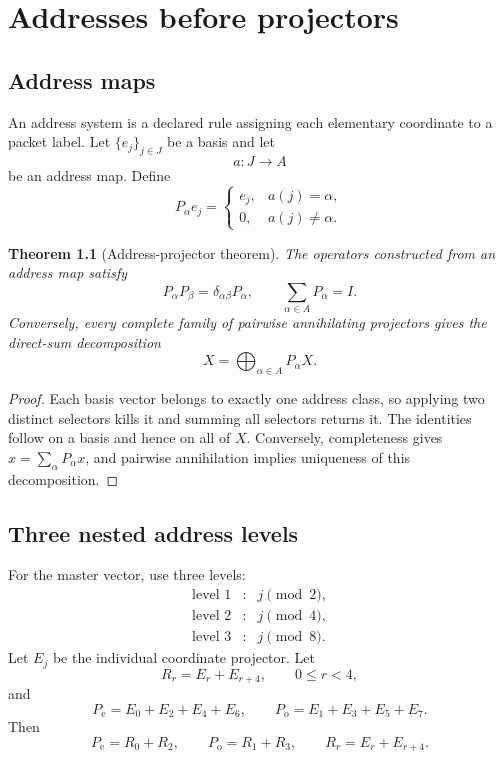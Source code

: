 \documentclass[11pt,oneside]{book}
\newtheorem{theorem}{Theorem}[chapter]
\theoremstyle{definition}
\theoremstyle{remark}
\begin{document}
\chapter{Addresses before projectors}\label{ch:addresses}

\section{Address maps}
An address system is a declared rule assigning each elementary coordinate to a packet label.  Let $\{e_j\}_{j\in J}$ be a basis and let
\[
a:J\longrightarrow A
\]
be an address map.  Define
\[
P_\alpha e_j=
\begin{cases}
e_j,&a(j)=\alpha,\\
0,&a(j)\ne\alpha.
\end{cases}
\]

\begin{theorem}[Address-projector theorem]\label{thm:address-projector}
The operators constructed from an address map satisfy
\[
P_\alpha P_\beta=\delta_{\alpha\beta}P_\alpha,
\qquad
\sum_{\alpha\in A}P_\alpha=I.
\]
Conversely, every complete family of pairwise annihilating projectors gives the direct-sum decomposition
\[
X=\bigoplus_{\alpha\in A}P_\alpha X.
\]
\end{theorem}

\begin{proof}
Each basis vector belongs to exactly one address class, so applying two distinct selectors kills it and summing all selectors returns it.  The identities follow on a basis and hence on all of $X$.  Conversely, completeness gives $x=\sum_\alpha P_\alpha x$, and pairwise annihilation implies uniqueness of this decomposition.
\end{proof}

\section{Three nested address levels}
For the master vector, use three levels:
\[
\begin{array}{ccl}
\text{level 1} &:& j\pmod 2,\\
\text{level 2} &:& j\pmod 4,\\
\text{level 3} &:& j\pmod 8.
\end{array}
\]
Let $E_j$ be the individual coordinate projector.  Let
\[
R_r=E_r+E_{r+4},\qquad 0\le r<4,
\]
and
\[
P_{\mathrm e}=E_0+E_2+E_4+E_6,
\qquad
P_{\mathrm o}=E_1+E_3+E_5+E_7.
\]
Then
\[
\boxed{
P_{\mathrm e}=R_0+R_2,
\qquad
P_{\mathrm o}=R_1+R_3,
\qquad
R_r=E_r+E_{r+4}.
}
\]
\end{document}
